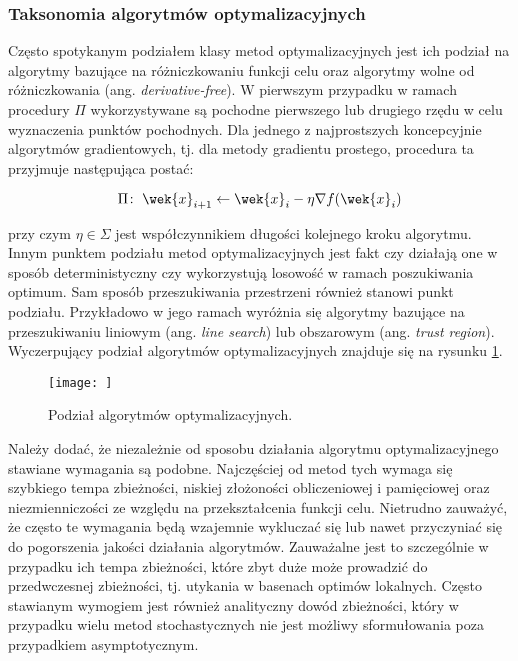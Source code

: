 \subsubsection{Taksonomia algorytmów optymalizacyjnych}
Często spotykanym podziałem klasy metod optymalizacyjnych jest ich podział na algorytmy bazujące na różniczkowaniu funkcji celu oraz algorytmy wolne od różniczkowania (ang. \textit{derivative-free}). W pierwszym przypadku w ramach procedury $\Pi$ wykorzystywane są pochodne pierwszego lub drugiego rzędu w celu wyznaczenia punktów pochodnych. Dla jednego z najprostszych koncepcyjnie algorytmów gradientowych, tj. dla metody gradientu prostego, procedura ta przyjmuje następująca postać:

\begin{equation*}
    \Pi\colon\; \wek{x}_{i+1} \leftarrow \wek{x}_{i} - \eta \nabla f(\wek{x}_{i})
\end{equation*}

przy czym $\eta \in \Sigma$ jest współczynnikiem długości kolejnego kroku algorytmu. Innym punktem podziału metod optymalizacyjnych jest fakt czy działają one w sposób deterministyczny czy wykorzystują losowość w ramach poszukiwania optimum. Sam sposób przeszukiwania przestrzeni również stanowi punkt podziału. Przykładowo w jego ramach wyróżnia się algorytmy bazujące na przeszukiwaniu liniowym (ang. \textit{line search}) lub obszarowym (ang. \textit{trust region}). 
Wyczerpujący podział algorytmów optymalizacyjnych znajduje się na rysunku \ref{fig:alg-task}.

\begin{figure}
    \centering
    \texttt{[image: ]}
    \caption{Podział algorytmów optymalizacyjnych.}
    \label{fig:alg-task}
\end{figure}

Należy dodać, że niezależnie od sposobu działania algorytmu optymalizacyjnego stawiane wymagania są podobne. Najczęściej od metod tych wymaga się szybkiego tempa zbieżności, niskiej złożoności obliczeniowej i pamięciowej oraz niezmienniczości ze względu na przekształcenia funkcji celu. Nietrudno zauważyć, że często te wymagania będą wzajemnie wykluczać się lub nawet przyczyniać się do pogorszenia jakości działania algorytmów. Zauważalne jest to szczególnie w przypadku ich tempa zbieżności, które zbyt duże może prowadzić do przedwczesnej zbieżności, tj. utykania w basenach optimów lokalnych. Często stawianym wymogiem jest również analityczny dowód zbieżności, który w przypadku wielu metod stochastycznych nie jest możliwy sformułowania poza przypadkiem asymptotycznym. 